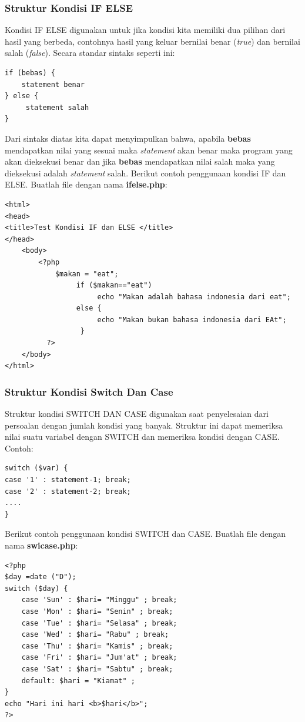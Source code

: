 \subsubsection{Struktur Kondisi IF ELSE}
Kondisi IF ELSE  digunakan untuk jika kondisi kita memiliki dua pilihan dari hasil yang berbeda, contohnya hasil yang keluar bernilai benar (\textit{true}) dan bernilai salah (\textit{false}). Secara standar sintaks seperti ini:
\begin{lstlisting}
if (bebas) {
    statement benar
} else {
     statement salah
}
\end{lstlisting}
Dari sintaks diatas kita dapat menyimpulkan bahwa, apabila \textbf{bebas} mendapatkan nilai yang sesuai maka \textit{statement} akan benar maka program yang akan dieksekusi benar dan jika \textbf{bebas} mendapatkan nilai salah maka yang dieksekusi adalah \textit{statement} salah. Berikut contoh penggunaan kondisi IF dan ELSE. Buatlah file dengan nama\textbf{ ifelse.php}:
\begin{lstlisting}
<html>
<head>
<title>Test Kondisi IF dan ELSE </title>
</head>
    <body>
        <?php
            $makan = "eat";
                 if ($makan=="eat")
                      echo "Makan adalah bahasa indonesia dari eat";
                 else {
                      echo "Makan bukan bahasa indonesia dari EAt";
                  }
          ?>
    </body>
</html>
\end{lstlisting}

\subsubsection{Struktur Kondisi Switch Dan Case}
Struktur kondisi SWITCH DAN CASE digunakan saat penyelesaian dari persoalan dengan jumlah kondisi yang banyak. Struktur ini dapat memeriksa nilai suatu variabel dengan SWITCH dan memeriksa kondisi dengan CASE. Contoh:
\begin{lstlisting}
switch ($var) {
case '1' : statement-1; break;
case '2' : statement-2; break;
....
}
\end{lstlisting}
Berikut contoh penggunaan kondisi SWITCH dan CASE. Buatlah file dengan nama\textbf{ swicase.php}:
\begin{lstlisting}
<?php
$day =date ("D");
switch ($day) {
    case 'Sun' : $hari= "Minggu" ; break;
    case 'Mon' : $hari= "Senin" ; break;
    case 'Tue' : $hari= "Selasa" ; break;
    case 'Wed' : $hari= "Rabu" ; break;
    case 'Thu' : $hari= "Kamis" ; break;
    case 'Fri' : $hari= "Jum'at" ; break;
    case 'Sat' : $hari= "Sabtu" ; break;
    default: $hari = "Kiamat" ;
}
echo "Hari ini hari <b>$hari</b>";
?>
\end{lstlisting}

